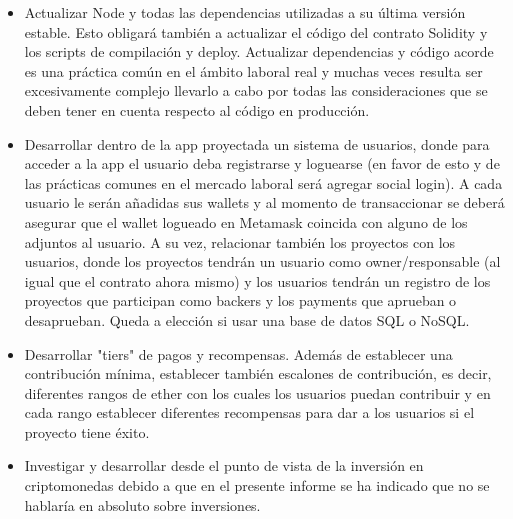 \begin{itemize}
	\item Actualizar Node y todas las dependencias utilizadas a su última versión estable. Esto
	obligará también a actualizar el código del contrato Solidity y los scripts de compilación y
	deploy. Actualizar dependencias y código acorde es una práctica común en el ámbito laboral real
	y muchas veces resulta ser excesivamente complejo llevarlo a cabo por todas las consideraciones
	que	se deben tener en cuenta respecto al código en producción. 
	
	\item Desarrollar dentro de la app proyectada un sistema de usuarios, donde para acceder a la
	app el usuario deba registrarse y loguearse (en favor de esto y de las prácticas comunes en el
	mercado laboral será agregar social login). A cada usuario le serán añadidas sus wallets y al
	momento de transaccionar se deberá asegurar que el wallet logueado en Metamask coincida con
	alguno de los adjuntos al usuario. A su vez, relacionar también los proyectos con los usuarios,
	donde los proyectos tendrán un usuario como owner/responsable (al igual que el contrato ahora
	mismo) y los usuarios tendrán un registro de los proyectos que participan como backers y los
	payments que aprueban o desaprueban. Queda a elección si usar una base de datos SQL o NoSQL.
	
	\item Desarrollar "tiers" de pagos y recompensas. Además de establecer una contribución mínima,
	establecer también escalones de contribución, es decir, diferentes rangos de ether con los
	cuales los usuarios puedan contribuir y en cada rango establecer diferentes recompensas
	para dar a los usuarios si el proyecto tiene éxito.	
	
	\item Investigar y desarrollar desde el punto de vista de la inversión en criptomonedas debido
	a que en el presente informe se ha indicado que no se hablaría en absoluto sobre inversiones.

\end{itemize}
